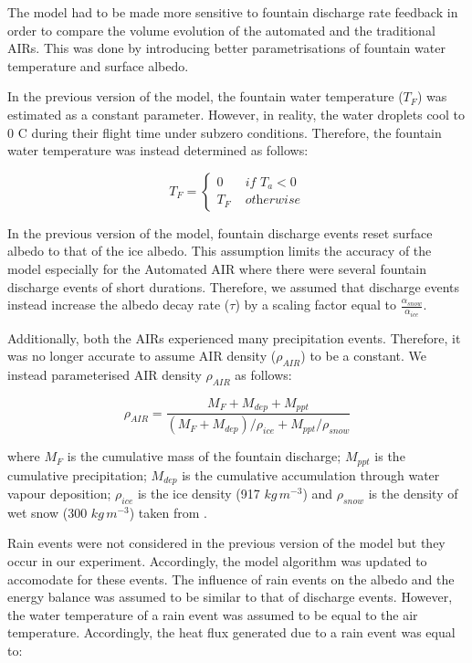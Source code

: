 \documentclass[tc, manuscript]{copernicus}
\begin{document}
The model had to be made more sensitive to fountain discharge rate feedback in order to compare the volume
evolution of the automated and the traditional AIRs. This was done by introducing better parametrisations of
fountain water temperature and surface albedo. 

In the previous version of the model, the fountain water temperature ($T_F$) was estimated as a constant
parameter. However, in reality, the water droplets cool to 0 C during their flight time under subzero
conditions. Therefore, the fountain water temperature was instead determined as follows:

\begin{equation}
	T_{F} = \left\{ \begin{array}{ll}
		0 & \textit{ if } T_{a} < 0 \\
		T_{F} & \textit{ otherwise}
	\end{array} \right.
\end{equation}

In the previous version of the model, fountain discharge events reset surface albedo to that of the ice albedo.
This assumption limits the accuracy of the model especially for the Automated AIR where there were several
fountain discharge events of short durations. Therefore, we assumed that discharge events instead
increase the albedo decay rate ($\tau$) by a scaling factor equal to $\frac{\alpha_{snow}}{\alpha_{ice}}$.

Additionally, both the AIRs experienced many precipitation events. Therefore, it was no longer accurate to
assume AIR density ($\rho_{AIR}$) to be a constant. We instead parameterised AIR density $\rho_{AIR}$ as follows:

\begin{equation}
  \rho_{AIR} = \frac{M_{F} + M_{dep} + M_{ppt}}{(M_{F} + M_{dep})/\rho_{ice} + M_{ppt}/\rho_{snow}}
\end{equation}

where $M_F$ is the cumulative mass of the fountain discharge; $M_{ppt}$ is the cumulative precipitation; $M_{dep}$ is the cumulative accumulation through water vapour deposition; $\rho_{ice}$ is the ice density (917 $kg\,m^{-3}$) and $\rho_{snow}$ is the density of wet snow (300 $kg\,m^{-3}$) taken from
\cite{cuffeyPhysicsGlaciers2010} .

Rain events were not considered in the previous version of the model but they occur in our experiment.
Accordingly, the model algorithm was updated to accomodate for these events. The influence of rain events on the
albedo and the energy balance was assumed to be similar to that of discharge events. However, the water
temperature of a rain event was assumed to be equal to the air temperature. Accordingly, the heat flux generated
due to a rain event was equal to:
\end{document}
